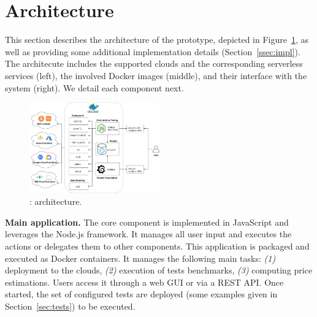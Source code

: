 \section{Architecture}\label{sec:architecture}
This section describes the architecture of the \sys prototype, depicted in Figure~\ref{fig:architecture}, as well as providing some additional implementation details (Section~\ref{ssec:impl}).
The architecute includes the supported clouds and the corresponding serverless services (left), the involved Docker images (middle), and their interface with the system (right).
We detail each component next. 

\begin{figure}[htp]
\begin{center}
\includegraphics[width=0.5\textwidth]{bilder/main_app.png}
\captionsetup{justification=centering, labelfont=bf}
\caption{\sys: architecture.}
\label{fig:architecture}
\end{center}
\end{figure}



\textbf{Main application.} The \sys core component is implemented in JavaScript and leverages the Node.js framework. 
It manages all user input and executes the actions or delegates them to other components. 
This application is packaged and executed as Docker containers. 
It manages the following main tasks: \emph{(1)} deployment to the clouds, \emph{(2)} execution of tests benchmarks, \emph{(3)} computing price estimations. 
Users access it through a web \gls{GUI} or via a REST \gls{API}. 
Once started, the set of configured tests are deployed (some examples given in Section~\ref{sec:tests}) to be executed.

